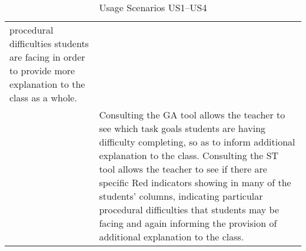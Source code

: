 \begin{table}[htbp]
\begin{tabular}{|p{0.5cm}|p{12.5cm}|}
{    procedural difficulties students are facing in order to provide
    more explanation to the
    class as a whole.} \\
  \cline{2-2} 
  & Consulting the GA tool allows the teacher to see which
  task goals students are having difficulty completing, so as to
  inform additional explanation to the class.  Consulting the ST tool
  allows the teacher to see if there are specific Red indicators
  showing in many of the students' columns, indicating particular
  procedural difficulties that students may be facing and again
  informing the provision of additional explanation to the class.\\
  \hline
  \end{tabular}
  \caption{Usage Scenarios US1--US4}
  \label{tab:UsageScenariosA}
\end{table}
 
